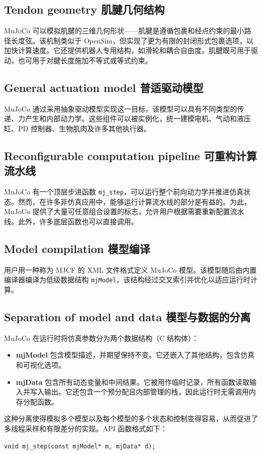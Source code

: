 \subsection{Tendon geometry 肌腱几何结构}
MuJoCo 可以模拟肌腱的三维几何形状——肌腱是遵循包裹和经点约束的最小路径长度弦。该机制类似于 OpenSim，但实现了更为有限的封闭形式包裹选项，以加快计算速度。它还提供机器人专用结构，如滑轮和耦合自由度。肌腱既可用于驱动，也可用于对腱长度施加不等式或等式约束。

\subsection{General actuation model 普适驱动模型}
MuJoCo 通过采用抽象驱动模型实现这一目标，该模型可以具有不同类型的传递、力产生和内部动力学。这些组件可以被实例化，统一建模电机、气动和液压缸、PD 控制器、生物肌肉及许多其他执行器。

\subsection{Reconfigurable computation pipeline 可重构计算流水线}
MuJoCo 有一个顶层步进函数 \texttt{mj\_step}，可以运行整个前向动力学并推进仿真状态。然而，在许多非仿真应用中，能够运行计算流水线的部分是有益的。为此，MuJoCo 提供了大量可任意组合设置的标志，允许用户根据需要重新配置流水线。此外，许多底层函数也可以直接调用。

\subsection{Model compilation 模型编译}
用户用一种称为 MJCF 的 XML 文件格式定义 MuJoCo 模型。该模型随后由内置编译器编译为低级数据结构 \texttt{mjModel}，该结构经过交叉索引并优化以适应运行时计算。

\subsection{Separation of model and data 模型与数据的分离}
MuJoCo 在运行时将仿真参数分为两个数据结构（C 结构体）：
\begin{itemize}
	\item \textbf{mjModel} 包含模型描述，并期望保持不变。它还嵌入了其他结构，包含仿真和可视化选项。
	\item \textbf{mjData} 包含所有动态变量和中间结果。它被用作临时记录，所有函数读取输入并写入输出。它还包含一个预分配且内部管理的栈，因此运行时无需调用内存分配函数。
\end{itemize}
这种分离使得模拟多个模型以及每个模型的多个状态和控制变得容易，从而促进了多线程采样和有限差分的实现。API 函数格式如下：
\begin{center}
	\texttt{void mj\_step(const mjModel* m, mjData* d);}
\end{center}

